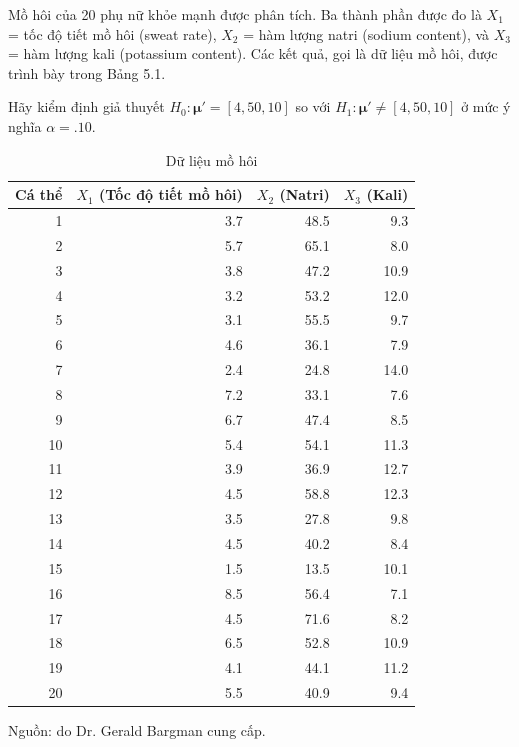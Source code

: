 Mồ hôi của 20 phụ nữ khỏe mạnh được phân tích. Ba thành phần được đo là
\(X_1\) = tốc độ tiết mồ hôi (sweat rate), \(X_2\) = hàm lượng natri (sodium
content), và \(X_3\) = hàm lượng kali (potassium content). Các kết quả, gọi là dữ
liệu mồ hôi, được trình bày trong Bảng 5.1.

Hãy kiểm định giả thuyết
\(H_0: \boldsymbol{\mu}'=[4,50,10]\) so với
\(H_1: \boldsymbol{\mu}'\ne[4,50,10]\) ở mức ý nghĩa \(\alpha=.10\).

\begin{table}[htbp]
\centering
\caption{Dữ liệu mồ hôi}
\label{tab:sweat-data}
\small
\begin{tabular}{rrrr}
\toprule
Cá thể & \(X_1\) (Tốc độ tiết mồ hôi) & \(X_2\) (Natri) & \(X_3\) (Kali) \\
\midrule
1  & 3.7 & 48.5 &  9.3 \\
2  & 5.7 & 65.1 &  8.0 \\
3  & 3.8 & 47.2 & 10.9 \\
4  & 3.2 & 53.2 & 12.0 \\
5  & 3.1 & 55.5 &  9.7 \\
6  & 4.6 & 36.1 &  7.9 \\
7  & 2.4 & 24.8 & 14.0 \\
8  & 7.2 & 33.1 &  7.6 \\
9  & 6.7 & 47.4 &  8.5 \\
10 & 5.4 & 54.1 & 11.3 \\
11 & 3.9 & 36.9 & 12.7 \\
12 & 4.5 & 58.8 & 12.3 \\
13 & 3.5 & 27.8 &  9.8 \\
14 & 4.5 & 40.2 &  8.4 \\
15 & 1.5 & 13.5 & 10.1 \\
16 & 8.5 & 56.4 &  7.1 \\
17 & 4.5 & 71.6 &  8.2 \\
18 & 6.5 & 52.8 & 10.9 \\
19 & 4.1 & 44.1 & 11.2 \\
20 & 5.5 & 40.9 &  9.4 \\
\bottomrule
\end{tabular}

\vspace{0.4em}
{\footnotesize Nguồn: do Dr. Gerald Bargman cung cấp.}
\end{table}

